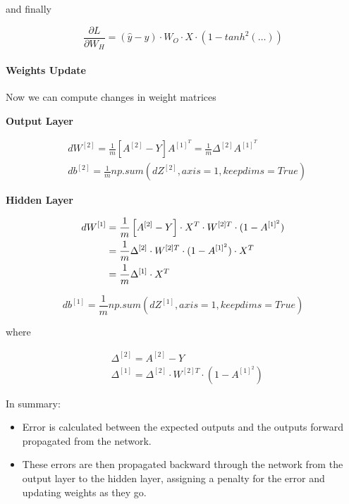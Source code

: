 \documentclass[11pt]{article}
\providecommand{\tightlist}{%
      \setlength{\itemsep}{0pt}\setlength{\parskip}{0pt}}
\begin{document}
and finally

\begin{equation}
\frac{\partial L}{\partial W_H} = (\hat y - y) \cdot W_O \cdot X \cdot \left( 1 - tanh^2(\dots) \right)
\end{equation}

\hypertarget{weights-update}{%
\paragraph{Weights Update}\label{weights-update}}

Now we can compute changes in weight matrices

\textbf{Output Layer}

\begin{align}
& dW^{[2]} = \frac{1}{m}\left[A^{[2]} - Y \right]A^{[1]^T} = \frac{1}{m}\Delta^{[2]}A^{[1]^T} \\
& db^{[2]} = \frac{1}{m}np.sum(dZ^{[2]}, axis=1, keepdims=True) 
\end{align}

\textbf{Hidden Layer}

\begin{align}
dW^{[1]} &= \frac{1}{m} \left[ A^{[2]} - Y \right] \cdot  X^{T} \cdot W^{[2]T} \cdot (1 - A^{[1]^2}) \notag\\
         &= \frac{1}{m} \Delta^{[2]} \cdot W^{[2]T} \cdot (1 - A^{[1]^2}) \cdot  X^{T}   \notag\\
         &= \frac{1}{m} \Delta^{[1]} \cdot  X^{T} 
\end{align}

\begin{equation} 
db^{[1]} = \frac{1}{m}np.sum(dZ^{[1]}, axis=1, keepdims=True)  
\end{equation}

where

\begin{align} 
& \Delta^{[2]} = A^{[2]} - Y  \\
& \Delta^{[1]} = \Delta^{[2]} \cdot W^{[2]T} \cdot (1 - A^{[1]^2})
\end{align}

In summary:

\begin{itemize}
\tightlist
\item
  Error is calculated between the expected outputs and the outputs
  forward propagated from the network.
\item
  These errors are then propagated backward through the network from the
  output layer to the hidden layer, assigning a penalty for the error
  and updating weights as they go.
\end{itemize}
\end{document}
